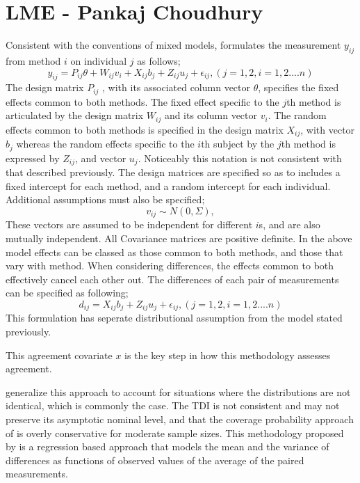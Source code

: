 \documentclass[MAIN.tex]{subfiles}
\begin{document}
	
	
	
	
	\section{LME - Pankaj Choudhury}
	Consistent with the conventions of mixed models, \citep{pkc}
	formulates the measurement $y_{ij} $from method $i$ on individual
	$j$ as follows;
	\begin{equation}
	y_{ij} =P_{ij}\theta + W_{ij}v_{i} + X_{ij}b_{j} + Z_{ij}u_{j} +
	\epsilon_{ij},     (j=1,2, i=1,2....n)
	\end{equation}
	The design matrix $P_{ij}$ , with its associated column vector
	$\theta$, specifies the fixed effects common to both methods. The
	fixed effect specific to the $j$th method is articulated by the
	design matrix $W_{ij}$ and its column vector $v_{i}$. The random
	effects common to both methods is specified in the design matrix
	$X_{ij}$, with vector $b_{j}$ whereas the random effects specific
	to the $i$th subject by the $j$th method is expressed by $Z_{ij}$,
	and vector $u_{j}$. Noticeably this notation is not consistent
	with that described previously.  The design matrices are specified
	so as to includes a fixed intercept for each method, and a random
	intercept for each individual. Additional assumptions must also be
	specified;
	\begin{equation}
	v_{ij} \sim N(0,\Sigma),
	\end{equation}
	These vectors are assumed to be independent for different $i$s,
	and are also mutually independent. All Covariance matrices are
	positive definite.  In the above model effects can be classed as
	those common to both methods, and those that vary with method.
	When considering differences, the effects common to both
	effectively cancel each other out. The differences of each pair of
	measurements can be specified as following;
	\begin{equation}
	d_{ij} = X_{ij}b_{j} + Z_{ij}u_{j} + \epsilon_{ij},     (j=1,2,
	i=1,2....n)
	\end{equation}
	This formulation has seperate distributional assumption from the
	model stated previously.
	
	This agreement covariate $x$ is the key step in how this
	methodology assesses agreement.
	
	\citet{pkcng} generalize this approach to account for situations
	where the distributions are not identical, which is commonly the
	case. The TDI is not consistent and may not preserve its
	asymptotic nominal level, and that the coverage probability
	approach of \citet{lin2002} is overly conservative for moderate
	sample sizes. This methodology proposed by \citet{pkcng} is a
	regression based approach that models the mean and the variance of
	differences as functions of observed values of the average of the
	paired measurements.





\end{document}
